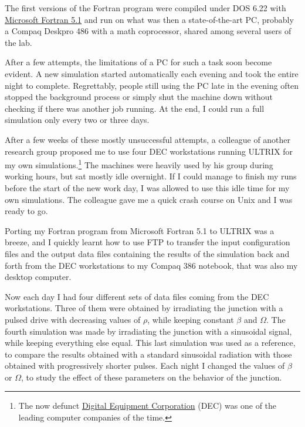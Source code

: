 The first versions of the Fortran program were compiled under DOS 6.22 with \href{https://winworldpc.com/product/microsoft-fortran/5x}{Microsoft Fortran 5.1} and run on what was then a state-of-the-art PC, probably a Compaq Deskpro 486 with a math coprocessor, shared among several users of the lab.

After a few attempts, the limitations of a PC for such a task soon become evident.
A new simulation started automatically each evening and took the entire night to complete. Regrettably, people still using the PC late in the evening often stopped the background process or simply shut the machine down without checking if there was another job running. 
At the end, I could run a full simulation only every two or three days.

After a few weeks of these mostly unsuccessful attempts, a colleague of another research group proposed me to use four DEC workstations running ULTRIX for my own simulations.\footnote{The now defunct \href{https://en.wikipedia.org/wiki/Digital_Equipment_Corporation}{Digital Equipment Corporation} (DEC) was one of the leading computer companies of the time.}
The machines were heavily used by his group during working hours, but sat mostly idle overnight. 
If I could manage to finish my runs before the start of the new work day, I was allowed to use this idle time for my own simulations.
The colleague gave me a quick crash course on Unix and I was ready to go.

Porting my Fortran program from Microsoft Fortran 5.1 to ULTRIX was a breeze, and I quickly learnt how to use FTP to transfer the input configuration files and the output data files containing the results of the simulation back and forth from the DEC workstations to my Compaq 386 notebook, that was also my desktop computer.

Now each day I had four different sets of data files coming from the DEC workstations. Three of them were obtained by irradiating the junction with a pulsed drive with decreasing values of $\rho$, while keeping constant $\beta$ and $\Omega$.
The fourth simulation was made by irradiating the junction with a sinusoidal signal, while keeping everything else equal. This last simulation was used as a reference, to compare the results obtained with a standard sinusoidal radiation with those obtained with progressively shorter pulses.
Each night I changed the values of $\beta$ or $\Omega$, to study the effect of these parameters on the behavior of the junction.


